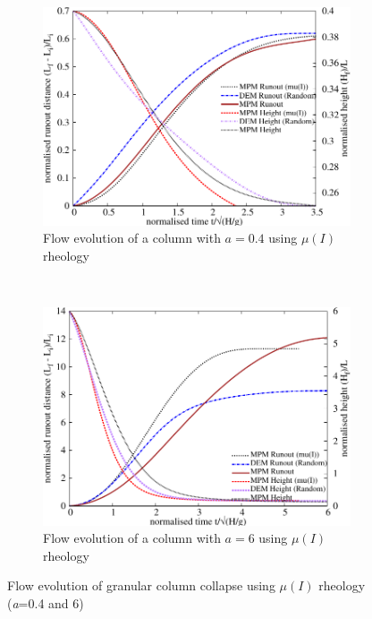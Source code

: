 \begin{figure}[tbhp]
\centering
\begin{subfigure}[b]{0.975\textwidth}
\includegraphics[width=\textwidth]{flowa04muI}
\caption{Flow evolution of a column with $a=0.4$ using $\mu(I)$ rheology}
\label{fig:flowa04muI}
\end{subfigure}
\\
\begin{subfigure}[b]{0.975\textwidth}
\centering
\includegraphics[width=\textwidth]{flowa6muI}
\caption{Flow evolution of a column with $a=6$ using $\mu(I)$ rheology}
\label{fig:flowa6muI}
\end{subfigure}
\caption{Flow evolution of granular column collapse using $\mu(I)$ rheology 
(\textit{a}=0.4 and 6)}
\label{fig:flow_muI}
\end{figure}

